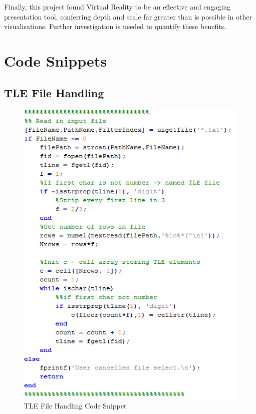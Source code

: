 \documentclass[12pt,openany,a4paper]{book}
\begin{document}
	 Finally, this project found Virtual Reality to be an effective and engaging presentation tool, conferring depth and scale far greater than is possible in other visualisations. Further investigation is needed to quantify these benefits.
	
	
	\appendix
	
	
	\mbox{}
	\newpage
	
	
	
	\chapter{Code Snippets}
	
	\section{TLE File Handling}
	
	\begin{figure}[H]
		\centering
		\caption{TLE File Handling Code Snippet}
		\label{TLEread}
		\includegraphics[scale=0.8]{TLEread.png}
	\end{figure}
	
\end{document}
